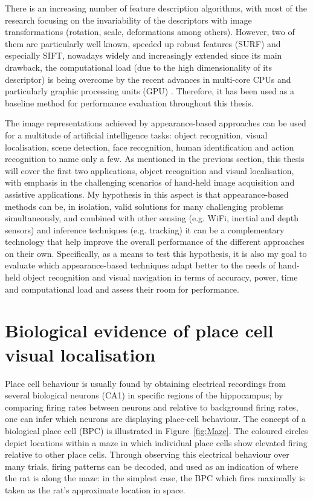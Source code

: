 There is an increasing number of feature description algorithms, with most of the research focusing on the invariability of the descriptors with image transformations (rotation, scale, deformations among others). However, two of them are particularly well known, speeded up robust features (SURF) and especially SIFT, nowadays widely and increasingly extended since its main drawback, the computational load (due to the high dimensionality of its descriptor) is being overcome by the recent advances in multi-core CPUs and particularly graphic processing units (GPU) \cite{Wu2007}. Therefore, it has been used as a baseline method for performance evaluation throughout this thesis.

The image representations achieved by appearance-based approaches can be used for a multitude of artificial intelligence tasks: object recognition, visual localisation, scene detection, face recognition, human identification and action recognition to name only a few. As mentioned in the previous section, this thesis will cover the first two applications, object recognition and visual localisation, with emphasis in the challenging scenarios of hand-held image acquisition and assistive applications. My hypothesis in this aspect is that appearance-based methods can be, in isolation, valid solutions for many challenging problems simultaneously, and combined with other sensing (e.g. WiFi, inertial and depth sensors) and inference techniques (e.g. tracking) it can be a complementary technology that help improve the overall performance of the different approaches on their own. Specifically, as a means to test this hypothesis, it is also my goal to evaluate which appearance-based techniques adapt better to the needs of hand-held object recognition and visual navigation in terms of accuracy, power, time and computational load and assess their room for performance.

\section{Biological evidence of place cell visual localisation} 

Place cell behaviour is usually found by obtaining electrical recordings from several biological neurons (CA1) in specific regions of the hippocampus; by comparing firing rates between neurons and relative to background firing rates, one can infer which neurons are displaying place-cell behaviour. The concept of a biological place cell (BPC) is illustrated in Figure~\ref{fig:Maze}.  The coloured circles depict locations within a maze in which individual place cells show elevated firing relative to other place cells.  Through observing this electrical behaviour over many trials, firing patterns can be decoded, and used as an indication of where the rat is along the maze: in the simplest case, the BPC which fires maximally is taken as the rat's approximate location in space. 

